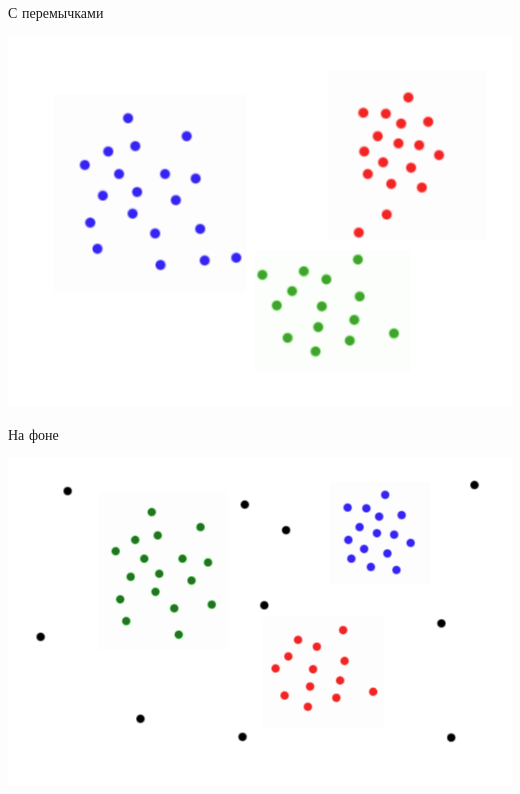 \documentclass[10pt]{beamer}
\begin{document}
\begin{frame}{С перемычками}
	\begin{center}
	  \includegraphics[height=0.8 \textheight, keepaspectratio = true]{images/cluster4}  
	\end{center}
\end{frame}

\begin{frame}{На фоне}
	\begin{center}
	  \includegraphics[height=0.8 \textheight, keepaspectratio = true]{images/cluster5}  
	\end{center}
\end{frame}
\end{document}
